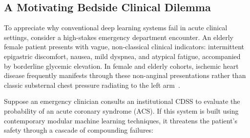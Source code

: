 \documentclass[3p,12pt]{elsarticle}
\theoremstyle{plain}
\theoremstyle{definition}
\begin{document}
\subsection{A Motivating Bedside Clinical Dilemma}
To appreciate why conventional deep learning systems fail in acute clinical settings, consider a high-stakes emergency department encounter. An elderly female patient presents with vague, non-classical clinical indicators: intermittent epigastric discomfort, nausea, mild dyspnea, and atypical fatigue, accompanied by borderline glycemic elevation. In female and elderly cohorts, ischemic heart disease frequently manifests through these non-anginal presentations rather than classic substernal chest pressure radiating to the left arm~\cite{detrano1989international,seyyed2021underdiagnosis}. 

Suppose an emergency clinician consults an institutional CDSS to evaluate the probability of an acute coronary syndrome (ACS). If this system is built using contemporary modular machine learning techniques, it threatens the patient's safety through a cascade of compounding failures:
\end{document}
